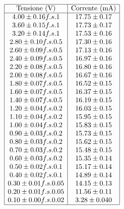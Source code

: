 \documentclass[a4paper,11pt]{article}
\begin{document}
\begin{minipage}{0.4\textwidth}
        \[
\begin{array}{|c|c|}
\hline
\text{Tensione (V)} & \text{Corrente (mA)}
\\ \hline
4.00 \pm 0.16 f.s. 1 & 17.75 \pm 0.17 \\ 
3.60 \pm 0.15 f.s. 1 & 17.73 \pm 0.17 \\ 
3.20 \pm 0.14 f.s. 1 & 17.53 \pm 0.16 \\ 
2.80 \pm 0.10 f.s. 0.5 & 17.30 \pm 0.16 \\ 
2.60 \pm 0.09 f.s. 0.5 & 17.13 \pm 0.16 \\ 
2.40 \pm 0.09 f.s. 0.5 & 16.97 \pm 0.16 \\ 
2.20 \pm 0.08 f.s. 0.5 & 16.80 \pm 0.16 \\ 
2.00 \pm 0.08 f.s. 0.5 & 16.67 \pm 0.16 \\ 
1.80 \pm 0.07 f.s. 0.5 & 16.52 \pm 0.15 \\ 
1.60 \pm 0.07 f.s. 0.5 & 16.37 \pm 0.15 \\ 
1.40 \pm 0.07 f.s. 0.5 & 16.19 \pm 0.15 \\ 
1.20 \pm 0.04 f.s. 0.2 & 16.03 \pm 0.15 \\ 
1.10 \pm 0.04 f.s. 0.2 & 15.95 \pm 0.15 \\ 
1.00 \pm 0.04 f.s. 0.2 & 15.83 \pm 0.15 \\ 
0.90 \pm 0.03 f.s. 0.2 & 15.73 \pm 0.15 \\ 
0.80 \pm 0.03 f.s. 0.2 & 15.62 \pm 0.15 \\ 
0.70 \pm 0.03 f.s. 0.2 & 15.48 \pm 0.15 \\ 
0.60 \pm 0.03 f.s. 0.2 & 15.35 \pm 0.14 \\ 
0.50 \pm 0.02 f.s. 0.1 & 15.17 \pm 0.14 \\ 
0.40 \pm 0.02 f.s. 0.1 & 14.89 \pm 0.14 \\ 
0.30 \pm 0.01 f.s. 0.05 & 14.15 \pm 0.13 \\ 
0.20 \pm 0.01 f.s. 0.05 & 11.56 \pm 0.11 \\ 
0.10 \pm 0.00 f.s. 0.02 & 3.28 \pm 0.040 \\
\hline
\end{array} \label{tab::dati_100}
\]
    \end{minipage}
    \hfill %
\end{document}
